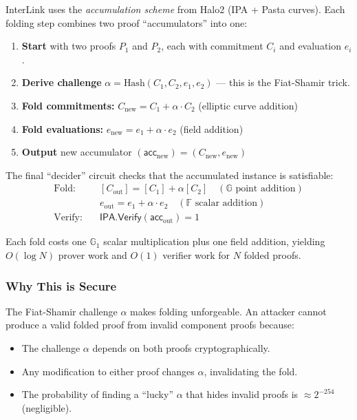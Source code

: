 \documentclass[11pt,a4paper]{article}
\begin{document}
InterLink uses the \emph{accumulation scheme} from Halo2 (IPA + Pasta curves). Each folding step combines two proof ``accumulators'' into one:

\begin{enumerate}
    \item \textbf{Start} with two proofs $P_1$ and $P_2$, each with commitment $C_i$ and evaluation $e_i$.
    \item \textbf{Derive challenge} $\alpha = \text{Hash}(C_1, C_2, e_1, e_2)$ --- this is the Fiat-Shamir trick.
    \item \textbf{Fold commitments:} $C_{\text{new}} = C_1 + \alpha \cdot C_2$ (elliptic curve addition)
    \item \textbf{Fold evaluations:} $e_{\text{new}} = e_1 + \alpha \cdot e_2$ (field addition)
    \item \textbf{Output} new accumulator $(\mathsf{acc}_{\text{new}}) = (C_{\text{new}}, e_{\text{new}})$
\end{enumerate}

The final ``decider'' circuit checks that the accumulated instance is satisfiable:
\begin{align}
  \text{Fold:} &\quad [C_{\text{out}}] = [C_1] + \alpha [C_2] \quad (\mathbb{G}\text{ point addition}) \label{eq:fold-c}\\
  &\quad e_{\text{out}} = e_1 + \alpha \cdot e_2 \quad (\mathbb{F}\text{ scalar addition}) \label{eq:fold-e}\\
  \text{Verify:} &\quad \mathsf{IPA.Verify}(\mathsf{acc}_{\text{out}}) = 1 \label{eq:fold-v}
\end{align}

Each fold costs one $\mathbb{G}_1$ scalar multiplication plus one field addition, yielding $O(\log N)$ prover work and $O(1)$ verifier work for $N$ folded proofs.

\subsubsection*{Why This is Secure}

The Fiat-Shamir challenge $\alpha$ makes folding unforgeable. An attacker cannot produce a valid folded proof from invalid component proofs because:

\begin{itemize}
    \item The challenge $\alpha$ depends on both proofs cryptographically.
    \item Any modification to either proof changes $\alpha$, invalidating the fold.
    \item The probability of finding a ``lucky'' $\alpha$ that hides invalid proofs is $\approx 2^{-254}$ (negligible).
\end{itemize}
\end{document}
